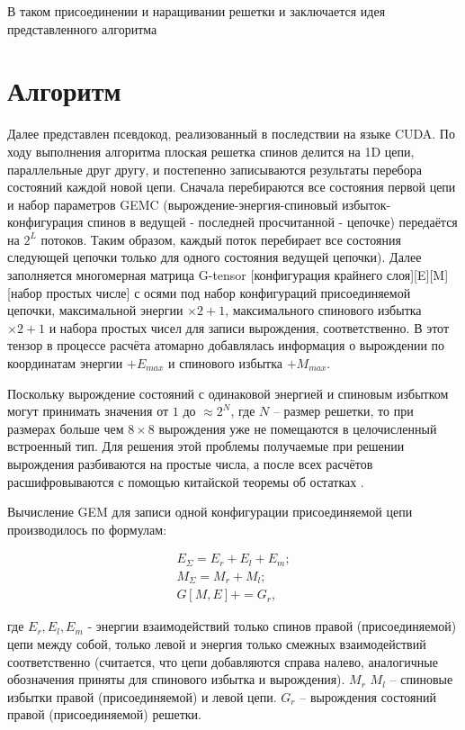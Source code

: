 \documentclass[10pt]{article}
\begin{document}
	В таком присоединении и наращивании решетки и заключается идея представленного алгоритма
	
	\section{Алгоритм}
	Далее представлен псевдокод, реализованный в последствии на языке CUDA. По ходу выполнения алгоритма плоская решетка спинов делится на 1D цепи, параллельные друг другу, и постепенно записываются результаты перебора состояний каждой новой цепи. Сначала перебираются все состояния первой цепи и набор параметров GEMC (вырождение-энергия-спиновый избыток-конфигурация спинов в ведущей - последней просчитанной - цепочке) передаётся на $2^L$ потоков. Таким образом, каждый поток перебирает все состояния следующей цепочки только для одного состояния ведущей цепочки). Далее заполняется многомерная матрица G-tensor [конфигурация крайнего слоя][E][M][набор простых числе] с осями под набор конфигураций присоединяемой цепочки, максимальной энергии $\times 2 + 1$, максимального спинового избытка $\times 2 + 1$ и набора простых чисел для записи вырождения, соответственно. В этот тензор в процессе расчёта атомарно добавлялась информация о вырождении по координатам энергии $+ E_{max}$ и спинового избытка $+ M_{max}$.
	
	Поскольку вырождение состояний с одинаковой энергией и спиновым избытком могут принимать значения от $1$ до $\approx 2^{N}$, где $N$ -- размер решетки, то при размерах больше чем $8 \times 8$ вырождения уже не помещаются в целочисленный встроенный тип. Для решения этой проблемы получаемые при решении вырождения разбиваются на простые числа, а после всех расчётов расшифровываются с помощью китайской теоремы об остатках \cite{katz2007mathematics}.
	
	Вычисление GEM для записи одной конфигурации присоединяемой цепи производилось по формулам:
	
	\begin{equation}
		\begin{split}
		E_\Sigma = E_r + E_l + E_m; \\
		M_\Sigma = M_r + M_l; \\
		G[M, E] += G_r,
		\end{split}
	\end{equation}
	
	\noindent где $E_r, E_l, E_m$ - энергии взаимодействий только спинов правой (присоединяемой) цепи между собой, только левой и энергия только смежных взаимодействий соответственно (считается, что цепи добавляются справа налево, аналогичные обозначения приняты для спинового избытка и вырождения). $M_r$ $M_l$ -- спиновые избытки правой (присоединяемой) и левой цепи. $G_r$ -- вырождения состояний правой (присоединяемой) решетки.
	
\end{document}
